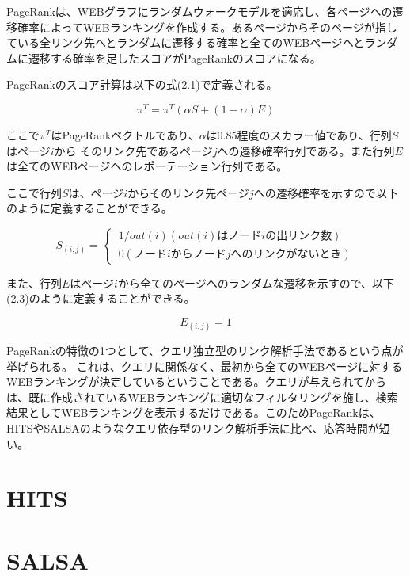 \documentclass[a4paper,11pt]{jreport}
\begin{document}
PageRankは、WEBグラフにランダムウォークモデルを適応し、各ページヘの遷移確率によってWEBランキングを作成する。あるページからそのページが指している全リンク先へとランダムに遷移する確率と全てのWEBページへとランダムに遷移する確率を足したスコアがPageRankのスコアになる。

PageRankのスコア計算は以下の式(2.1)で定義される。

\begin{equation}
\pi^T = \pi^T(\alpha S + (1 - \alpha)E) 
\end{equation}

ここで$\pi^T$はPageRankベクトルであり、$\alpha$は0.85程度のスカラー値であり、行列$S$はページ$i$から
そのリンク先であるページ$j$への遷移確率行列である。また行列$E$は全てのWEBページヘのレポーテーション行列である。

ここで行列$S$は、ページ$i$からそのリンク先ページ$j$への遷移確率を示すので以下のように定義することができる。

\begin{equation}
S_(i,j) =
\begin{cases}
\; 1/out(i)　(out(i)はノードiの出リンク数) \\
\; 0　(ノードiからノードjへのリンクがないとき)
\end{cases}
\end{equation}

また、行列$E$はページ$i$から全てのページへのランダムな遷移を示すので、以下(2.3)のように定義することができる。

\begin{equation}
E_(i,j) = 1
\end{equation}

PageRankの特徴の1つとして、クエリ独立型のリンク解析手法であるという点が挙げられる。
これは、クエリに関係なく、最初から全てのWEBページに対するWEBランキングが決定しているということである。クエリが与えられてからは、既に作成されているWEBランキングに適切なフィルタリングを施し、検索結果としてWEBランキングを表示するだけである。このためPageRankは、HITSやSALSAのようなクエリ依存型のリンク解析手法に比べ、応答時間が短い。

\section{HITS}
\section{SALSA}

\end{document}

